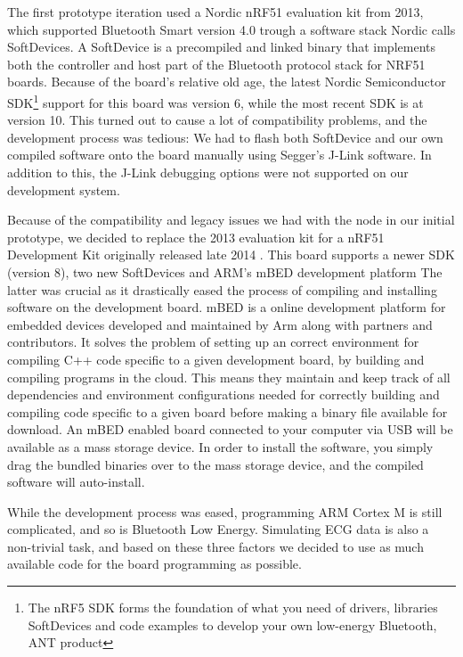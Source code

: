 The first prototype iteration used a Nordic nRF51 evaluation kit from 2013, which supported Bluetooth Smart version 4.0 trough a software stack Nordic calls SoftDevices. A SoftDevice is a precompiled and linked binary that implements both the controller and host part of the Bluetooth protocol stack for NRF51 boards. Because of the board's relative old age, the latest Nordic Semiconductor SDK\footnote{ The nRF5 SDK forms the foundation of what you need of drivers, libraries SoftDevices and code examples to develop your own low-energy Bluetooth, ANT product} support for this board was version 6, while the most recent SDK is at version 10. This turned out to cause a lot of compatibility problems, and the development process was tedious: We had to flash both SoftDevice and our own compiled software onto the board manually using Segger's J-Link software. In addition to this, the J-Link debugging options were not supported on our development system.

Because of the compatibility and legacy issues we had with the node in our initial prototype, we decided to replace the 2013 evaluation kit for a nRF51 Development Kit originally released late 2014 \cite{newRef:53}. This board supports a newer SDK (version 8), two new SoftDevices and ARM's mBED development platform \cite{newRef:54} The latter was crucial as it drastically eased the process of compiling and installing software on the development board. mBED is a online development platform for embedded devices developed and maintained by Arm \cite{newRef:55} along with partners and contributors. It solves the problem of setting up an correct environment for compiling C++ code specific to a given development board, by building and compiling programs in the cloud. This means they maintain and keep track of all dependencies and environment configurations needed for correctly building and compiling code specific to a given board before making a binary file available for download. An mBED enabled board connected to your computer via USB will be available as a mass storage device. In order to install the software, you simply drag the bundled binaries over to the mass storage device, and the compiled software will auto-install. 

While the development process was eased, programming ARM Cortex M is still complicated, and so is Bluetooth Low Energy. Simulating ECG data is also a non-trivial task, and based on these three factors we decided to use as much available code for the board programming as possible.

